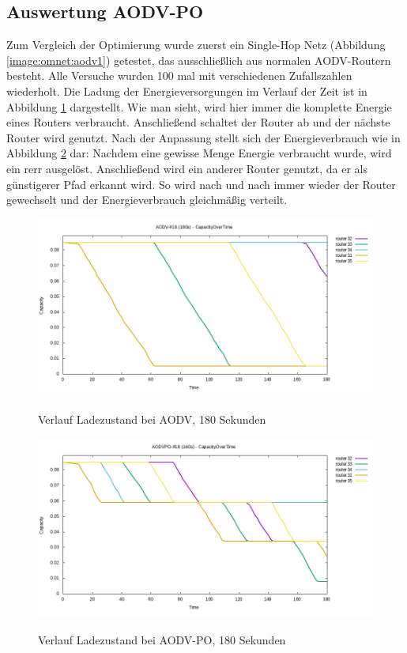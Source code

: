 \subsection{Auswertung AODV-PO}
\label{chapter:auswertung:versuche-aodv}

Zum Vergleich der Optimierung wurde zuerst ein Single-Hop Netz (\vgl Abbildung \ref{image:omnet:aodv1}) getestet, das ausschließlich aus normalen AODV-Routern besteht. Alle Versuche wurden 100 mal mit verschiedenen Zufallszahlen wiederholt. Die Ladung der Energieversorgungen im Verlauf der Zeit ist in Abbildung   \ref{image:omnet:olsr:av1} dargestellt. Wie man sieht, wird hier immer die komplette Energie eines Routers verbraucht. Anschließend schaltet der Router ab und der nächste Router wird genutzt. Nach der Anpassung stellt sich der Energieverbrauch wie in Abbildung \ref{image:omnet:olsr:av5} dar: Nachdem eine gewisse Menge Energie verbraucht wurde, wird ein \gls{rerr} ausgelöst. Anschließend wird ein anderer Router genutzt, da er als günstigerer Pfad erkannt wird. So wird nach und nach immer wieder der Router gewechselt und der Energieverbrauch gleichmäßig verteilt.\newline

\begin{figure}
  \centering
  \includegraphics[scale=0.45]{bilder/av1.png} \\
  \caption{Verlauf Ladezustand bei AODV, 180 Sekunden}
  \label{image:omnet:olsr:av1}
\end{figure}

\begin{figure}
  \centering
  \includegraphics[scale=0.45]{bilder/av5.png} \\
  \caption{Verlauf Ladezustand bei AODV-PO, 180 Sekunden}
  \label{image:omnet:olsr:av5}
\end{figure}

